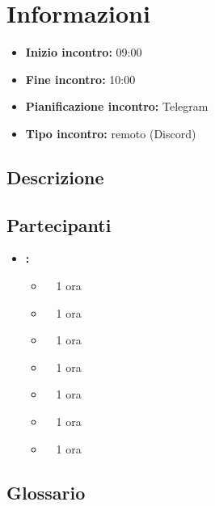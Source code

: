 \section{Informazioni}
\begin{itemize}
	\item \textbf{Inizio incontro:} 09:00
	\item \textbf{Fine incontro:} 10:00
	\item \textbf{Pianificazione incontro:} Telegram
	\item \textbf{Tipo incontro:} remoto (Discord)
\end{itemize}

\subsection{Descrizione}
\DocDescription

\subsection{Partecipanti}

\begin{itemize}
	\item \textbf{\GroupName:}
	\begin{itemize}
		\item \tommaso \ \rightarrow\ 1 ora
		\item \marco \ \rightarrow\ 1 ora
		\item \riccardo \ \rightarrow\ 1 ora
		\item \raul \ \rightarrow\ 1 ora
		\item \martina \ \rightarrow\ 1 ora
		\item \sebastiano \ \rightarrow\ 1 ora
		\item \mattia \ \rightarrow\ 1 ora
	\end{itemize}
\end{itemize}

\subsection{Glossario}
\GlossarioIntroduzione

\clearpage